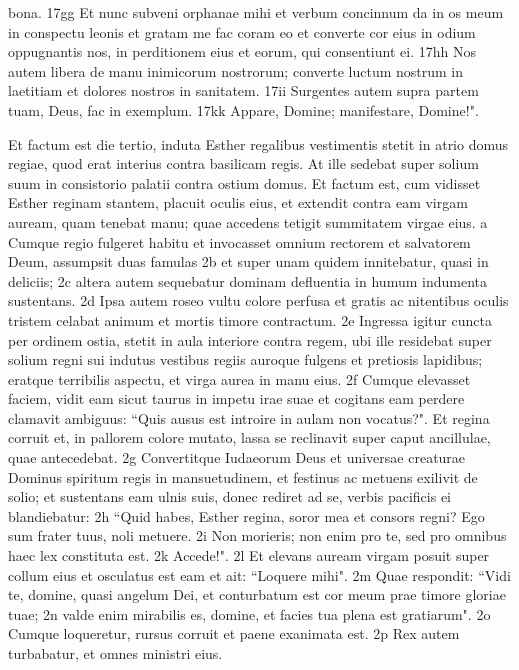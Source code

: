 \begin{biblechapter}
bona. 17gg Et nunc subveni orphanae mihi et verbum concinnum da in os meum in conspectu leonis et gratam me fac coram eo et converte cor eius in odium oppugnantis nos, in perditionem eius et eorum, qui consentiunt ei. 17hh Nos autem libera de manu inimicorum nostrorum; converte luctum nostrum in laetitiam et dolores nostros in sanitatem. 17ii Surgentes autem supra partem tuam, Deus, fac in exemplum. 17kk Appare, Domine; manifestare, Domine!". 
\end{biblechapter}

\begin{biblechapter} 
\verse Et factum est die tertio, induta Esther regalibus vestimentis stetit in atrio domus regiae, quod erat interius contra basilicam regis. At ille sedebat super solium suum in consistorio palatii contra ostium domus. 
\verse Et factum est, cum vidisset Esther reginam stantem, placuit oculis eius, et extendit contra eam virgam auream, quam tenebat manu; quae accedens tetigit summitatem virgae eius. 
\verse a Cumque regio fulgeret habitu et invocasset omnium rectorem et salvatorem Deum, assumpsit duas famulas 2b et super unam quidem innitebatur, quasi in deliciis; 2c altera autem sequebatur dominam defluentia in humum indumenta sustentans. 2d Ipsa autem roseo vultu colore perfusa et gratis ac nitentibus oculis tristem celabat animum et mortis timore contractum. 2e Ingressa igitur cuncta per ordinem ostia, stetit in aula interiore contra regem, ubi ille residebat super solium regni sui indutus vestibus regiis auroque fulgens et pretiosis lapidibus; eratque terribilis aspectu, et virga aurea in manu eius. 2f Cumque elevasset faciem, vidit eam sicut taurus in impetu irae suae et cogitans eam perdere clamavit ambiguus: “Quis ausus est introire in aulam non vocatus?". Et regina corruit et, in pallorem colore mutato, lassa se reclinavit super caput ancillulae, quae antecedebat. 2g Convertitque Iudaeorum Deus et universae creaturae Dominus spiritum regis in mansuetudinem, et festinus ac metuens exilivit de solio; et sustentans eam ulnis suis, donec rediret ad se, verbis pacificis ei blandiebatur: 2h “Quid habes, Esther regina, soror mea et consors regni? Ego sum frater tuus, noli metuere. 2i Non morieris; non enim pro te, sed pro omnibus haec lex constituta est. 2k Accede!". 2l Et elevans auream virgam posuit super collum eius et osculatus est eam et ait: “Loquere mihi". 2m Quae respondit: “Vidi te, domine, quasi angelum Dei, et conturbatum est cor meum prae timore gloriae tuae; 2n valde enim mirabilis es, domine, et facies tua plena est gratiarum". 2o Cumque loqueretur, rursus corruit et paene exanimata est. 2p Rex autem turbabatur, et omnes ministri eius. 

\end{biblechapter}
